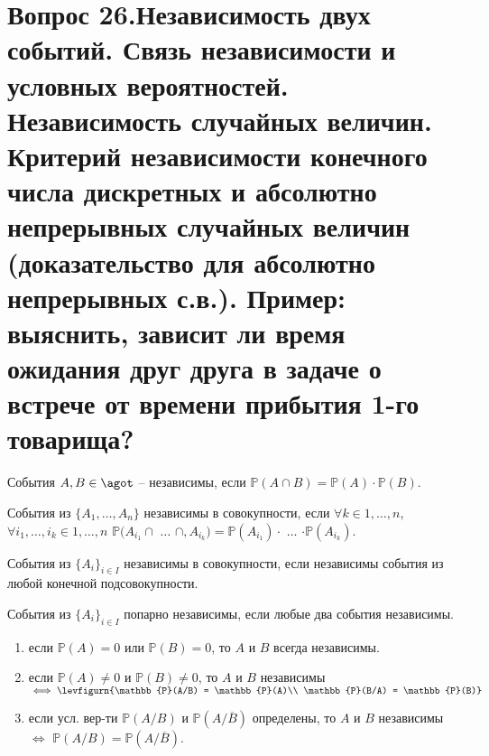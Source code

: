 \section{Вопрос 26.Независимость двух событий. Связь независимости и условных вероятностей. Независимость случайных величин. Критерий независимости конечного числа дискретных и абсолютно непрерывных случайных величин (доказательство для абсолютно непрерывных с.в.). Пример:  выяснить, зависит ли время ожидания друг друга в задаче о встрече от времени прибытия 1-го товарища?}

\begin{defs}
	События $A,B \in \agot$ -- независимы, если $\mathbb{P}(A \cap B) = \mathbb{P}(A)\cdot \mathbb{P}(B)$.
\end{defs}

\begin{defs}[]
		События из $\{A_1,\dots,A_n\}$ независимы в совокупности, если $\forall k \in 1,\dots,n$, $\forall i_{1},\dots,i_{k} \in 1,\dots,n$
		$\mathbb{P}(A_{i_{1}}\cap$ $\dots$ $\cap,A_{i_{k}}) = \mathbb{P}(A_{i_{1}})\cdot$ $\dots$ $\cdot \mathbb{P}(A_{i_{k}})$.
\end{defs}

\begin{defs}[]
	События из $\{A_i\}_{i \in I}$ независимы в совокупности, если независимы события из любой конечной подсовокупности.
\end{defs}

\begin{defs}[]
	События из $\{A_i\}_{i \in I}$ попарно независимы, если любые два события независимы.
\end{defs}

\begin{proofs}
	\begin{enumerate}
		\item если $\mathbb{P}(A)=0$ или $\mathbb{P}(B)=0$, то $A$ и $B$ всегда независимы.
		\item если $\mathbb{P}(A) \neq 0$ и $\mathbb{P}(B) \neq 0$, то $A$ и $B$ независимы $\iff \levfigurn{\mathbb{P}(A/B) = \mathbb{P}(A)\\ \mathbb{P}(B/A) = \mathbb{P}(B)}$
		\item если усл. вер-ти $\mathbb{P}(A/B)$ и $\mathbb{P}(A/\overline{B})$ определены, то $A$ и $B$ независимы $\iff$ $\mathbb{P}(A/B) = \mathbb{P}(A/\overline{B})$.
 	\end{enumerate}
\end{proofs}

